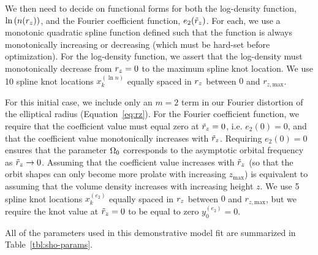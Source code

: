 We then need to decide on functional forms for both the log-density function,
$\ln\left(n(r_z)\right)$, and the Fourier coefficient function, $e_2(\tilde{r}_z)$.
For each, we use a monotonic quadratic spline function defined such that the function is
always monotonically increasing or decreasing (which must be hard-set before
optimization).
For the log-density function, we assert that the log-density must monotonically
decrease from $r_z = 0$ to the maximum spline knot location.
We use 10 spline knot locations $x_k^{(\ln n)}$ equally spaced in $r_z$ between $0$ and
$r_{z, \textrm{max}}$.

For this initial case, we include only an $m=2$ term in our Fourier distortion of the
elliptical radius (Equation~\ref{eq:rz}).
For the Fourier coefficient function, we require that the coefficient value must equal
zero at $\tilde{r}_z = 0$, i.e. $e_2(0) = 0$, and that the coefficient value monotonically
increases with $\tilde{r}_z$.
Requiring $e_2(0) = 0$ ensures that the parameter $\Omega_0$ corresponds to the
asymptotic orbital frequency as $\tilde{r}_z \rightarrow 0$.
Assuming that the coefficient value increases with $\tilde{r}_z$ (so that the orbit shapes
can only become more prolate with increasing $z_{\textrm{max}}$) is equivalent to
assuming that the volume density increases with increasing height $z$.
We use 5 spline knot locations $x_k^{(e_2)}$ equally spaced in $r_z$ between $0$ and
$r_{z, \textrm{max}}$, but we require the knot value at $\tilde{r}_z = 0$ to be equal to zero
$y_0^{(e_2)}=0$.

All of the parameters used in this demonstrative model fit are summarized in
Table~\ref{tbl:sho-params}.

